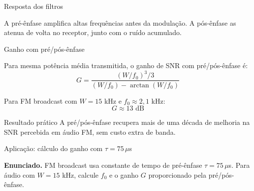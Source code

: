 \begin{frame}{Resposta dos filtros}

\begin{center}
\end{center}

A pré-ênfase amplifica altas frequências antes da modulação. A pós-ênfase as atenua de volta no receptor, junto com o ruído acumulado.

\end{frame}


\begin{frame}{Ganho com pré/pós-ênfase}

Para mesma potência média transmitida, o ganho de SNR com pré/pós-ênfase é:
\[
G = \frac{(W/f_0)^3 / 3}{(W/f_0) - \arctan(W/f_0)}
\]

Para FM broadcast com $W = 15$ kHz e $f_0 \approx 2{,}1$ kHz:
\[
G \approx 13 \text{ dB}
\]

\vspace{0.3cm}

\begin{block}{Resultado prático}
A pré/pós-ênfase recupera mais de uma década de melhoria na SNR percebida em áudio FM, sem custo extra de banda.
\end{block}

\end{frame}


\begin{frame}{Aplicação: cálculo do ganho com $\tau = 75\,\mu$s}

\textbf{Enunciado.} FM broadcast usa constante de tempo de pré-ênfase $\tau = 75\,\mu$s. Para áudio com $W = 15$ kHz, calcule $f_0$ e o ganho $G$ proporcionado pela pré/pós-ênfase.

\begin{center}
\end{center}

\end{frame}

